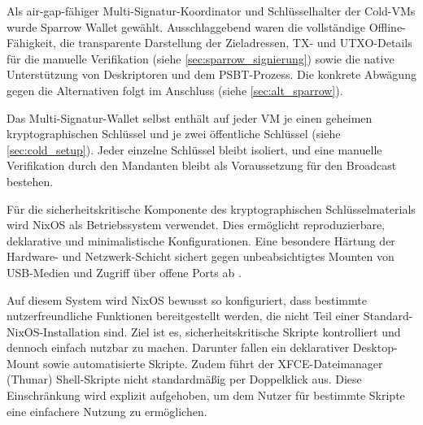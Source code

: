 Als air-gap-fähiger Multi-Signatur-Koordinator und Schlüsselhalter der Cold-\acp{VM} wurde Sparrow Wallet gewählt. Ausschlaggebend waren die vollständige Offline-Fähigkeit, die transparente Darstellung der Zieladressen, \ac{TX}- und \ac{UTXO}-Details für die manuelle Verifikation (siehe \ref{sec:sparrow_signierung}) sowie die native Unterstützung von Deskriptoren und dem \ac{PSBT}-Prozess. Die konkrete Abwägung gegen die Alternativen folgt im Anschluss (siehe \ref{sec:alt_sparrow}).

Das Multi-Signatur-Wallet selbst enthält auf jeder \ac{VM} je einen geheimen kryptographischen Schlüssel und je zwei öffentliche Schlüssel (siehe \ref{sec:cold_setup}). Jeder einzelne Schlüssel bleibt isoliert, und eine manuelle Verifikation durch den Mandanten bleibt als Voraussetzung für den Broadcast bestehen.

Für die sicherheitskritische Komponente des kryptographischen Schlüsselmaterials wird NixOS als Betriebssystem verwendet. Dies ermöglicht reproduzierbare, deklarative und minimalistische Konfigurationen. Eine besondere Härtung der Hardware- und Netzwerk-Schicht sichert gegen unbeabsichtigtes Mounten von \ac{USB}-Medien und Zugriff über offene Ports ab \cite{nixos_funktionsweise}.

Auf diesem System wird NixOS bewusst so konfiguriert, dass bestimmte nutzerfreundliche Funktionen bereitgestellt werden, die nicht Teil einer Standard-NixOS-Installation sind. Ziel ist es, sicherheitskritische Skripte kontrolliert und dennoch einfach nutzbar zu machen.
Darunter fallen ein deklarativer Desktop-Mount sowie automatisierte Skripte. Zudem führt der \ac{XFCE}-Dateimanager (Thunar) Shell-Skripte nicht standardmäßig per Doppelklick aus. Diese Einschränkung wird explizit aufgehoben, um dem Nutzer für bestimmte Skripte eine einfachere Nutzung zu ermöglichen.


